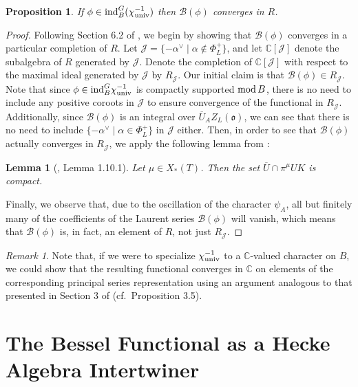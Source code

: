 \documentclass[11pt,letterpaper]{article}
\newcommand{\C}{\mathbb{C}}
\newcommand{\calB}{\mathcal{B}}
\newcommand{\calJ}{\mathcal{J}}
\newcommand{\goth}{\mathfrak}
\newcommand{\ind}{\textup{ind}}
\newtheorem{Proposition}[Theorem]{Proposition}
\newtheorem{Lemma}[Theorem]{Lemma}
\theoremstyle{remark}
\newtheorem*{remark}{Remark}
\numberwithin{equation}{section}
\begin{document}
\begin{Proposition}
If $\phi \in \ind_B^G (\chi_{\textup{univ}}^{-1})$ then $\calB(\phi)$ converges in $R$.
\end{Proposition}
\begin{proof}
Following Section 6.2 of \cite{HKP}, we begin by showing that $\calB(\phi)$ converges in a particular completion of $R$. Let $\calJ = \{-\alpha^{\vee} \mid \alpha \not\in \Phi_L^+\}$, and let $\C[\calJ]$ denote the subalgebra of $R$ generated by $\calJ$. Denote the completion of $\C[\calJ]$ with respect to the maximal ideal generated by $\calJ$ by $R_{\calJ}$. Our initial claim is that $\calB(\phi) \in R_{\calJ}$. Note that since $\phi \in \ind_B^G \chi_{\textup{univ}}^{-1}$ is compactly supported $\textup{mod}\, B$, there is no need to include any positive coroots in $\calJ$ to ensure convergence of the functional in $R_{\calJ}$. Additionally, since $\calB(\phi)$ is an integral over $\overline{U}_AZ_L(\goth{o})$, we can see that there is no need to include $\{-\alpha^{\vee} \mid \alpha \in \Phi_L^+\}$ in $\calJ$ either. Then, in order to see that $\calB(\phi)$ actually converges in $R_{\calJ}$, we apply the following lemma from \cite{HKP}:

\begin{Lemma}[\cite{HKP}, Lemma 1.10.1]
Let $\mu \in X_{\ast}(T)$. Then the set $\overline{U} \cap \pi^{\mu}UK$ is compact.
\end{Lemma}

Finally, we observe that, due to the oscillation of the character $\psi_A$, all but finitely many of the coefficients of the Laurent series $\calB(\phi)$ will vanish, which means that $\calB(\phi)$ is, in fact, an element of $R$, not just $R_{\calJ}$.
\end{proof}

\begin{remark}
Note that, if we were to specialize $\chi_{\textup{univ}}^{-1}$ to a $\C$-valued character on $B$, we could show that the resulting functional converges in $\C$ on elements of the corresponding principal series representation using an argument analogous to that presented in Section 3 of \cite{FG} (cf.~Proposition 3.5).
\end{remark}

\section{The Bessel Functional as a Hecke Algebra Intertwiner} \label{sec:intertwiner}
\end{document}
